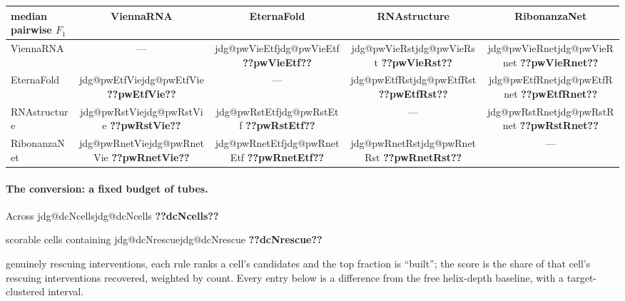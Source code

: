 \documentclass[11pt]{article}
\makeatletter
\newcommand{\jdg}[1]{%
  \ifcsname jdg@#1\endcsname\csname jdg@#1\endcsname
  \else\textbf{??#1??}\PackageError{nm}{undefined measured quantity #1}{}\fi}
\makeatother
\begin{document}
\begin{center}\footnotesize\setlength{\tabcolsep}{5pt}
\begin{tabular}{@{}lcccc@{}}
\toprule
median pairwise $F_1$ & ViennaRNA & EternaFold & RNAstructure & RibonanzaNet \\
\midrule
ViennaRNA    & ---              & \jdg{pwVieEtf}  & \jdg{pwVieRst}  & \jdg{pwVieRnet} \\
EternaFold   & \jdg{pwEtfVie}   & ---             & \jdg{pwEtfRst}  & \jdg{pwEtfRnet} \\
RNAstructure & \jdg{pwRstVie}   & \jdg{pwRstEtf}  & ---             & \jdg{pwRstRnet} \\
RibonanzaNet & \jdg{pwRnetVie}  & \jdg{pwRnetEtf} & \jdg{pwRnetRst} & --- \\
\bottomrule
\end{tabular}
\end{center}

\paragraph{The conversion: a fixed budget of tubes.} Across \jdg{dcNcells} scorable cells
containing \jdg{dcNrescue} genuinely rescuing interventions, each rule ranks a cell's candidates
and the top fraction is ``built''; the score is the share of that cell's rescuing interventions recovered, weighted by count. Every entry below is a difference from the free
helix-depth baseline, with a target-clustered interval.
\end{document}
